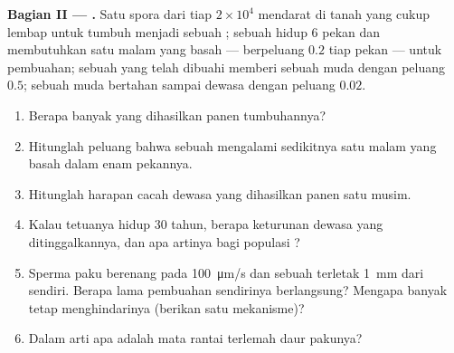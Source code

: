 \begin{problem}
\medskip
\noindent\textbf{Bagian II --- .}
Satu spora dari tiap $2\times 10^{4}$ mendarat di tanah yang cukup
lembap untuk tumbuh menjadi sebuah ; sebuah  hidup
\num{6} pekan dan membutuhkan satu malam yang basah --- berpeluang
$0.2$ tiap pekan --- untuk pembuahan; sebuah  yang telah
dibuahi memberi sebuah  muda dengan peluang $0.5$; sebuah
 muda bertahan sampai dewasa dengan peluang $0.02$.
\begin{enumerate}[resume]
  \item Berapa banyak  yang dihasilkan panen tumbuhannya?
  \item Hitunglah peluang bahwa sebuah  mengalami sedikitnya
        satu malam yang basah dalam enam pekannya.
  \item Hitunglah harapan cacah  dewasa yang dihasilkan
        panen satu musim.
  \item Kalau tetuanya hidup \num{30} tahun, berapa keturunan dewasa
        yang ditinggalkannya, dan apa artinya bagi populasi
        ?
  \item Sperma paku berenang pada \qty{100}{\micro m/s} dan 
        sebuah  terletak \qty{1}{mm} dari 
        sendiri. Berapa lama pembuahan sendirinya berlangsung? Mengapa
        banyak  tetap menghindarinya (berikan satu
        mekanisme)?
  \item Dalam arti apa  adalah mata rantai terlemah daur
        pakunya?
\end{enumerate}


\end{problem}
